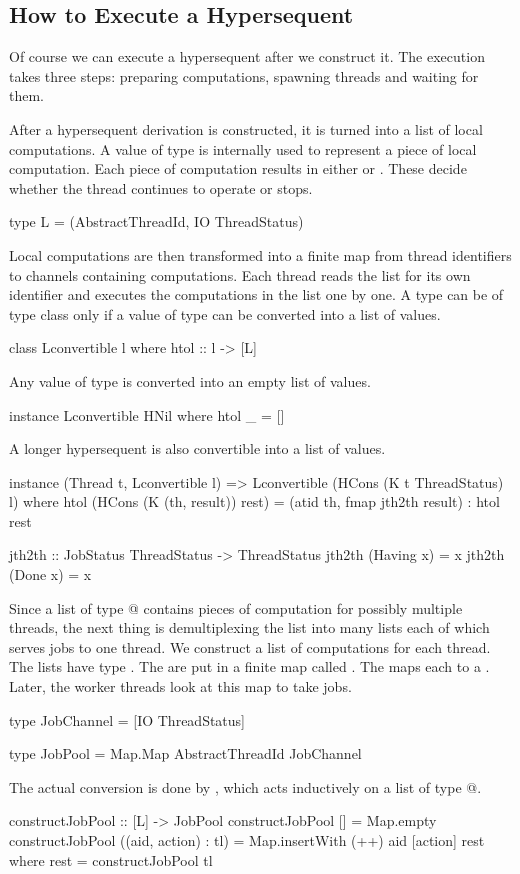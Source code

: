 \subsection{How to Execute a Hypersequent}
Of course we can execute a hypersequent after we construct it.  The
execution takes three steps: preparing computations, spawning
threads and waiting for them.

After a hypersequent derivation is constructed, it is turned into a list
of local computations.  A value of type \verb@L@ is internally used to
represent a piece of
local computation.  Each piece of computation results in either \verb@TryAnotherJob@
or \verb@Finished@.  These decide whether the thread continues to operate or stops.
\begin{code}
type L = (AbstractThreadId, IO ThreadStatus)
\end{code}

Local computations are then transformed into a finite map from thread
identifiers to channels containing computations. Each thread reads the list for
its own identifier and executes the computations in the list one by one.
A type \verb@l@ can be of type class \verb@Lconvertible@ only if
a value of type \verb@l@ can be converted into a list of \verb@L@
values.
\begin{code}
class Lconvertible l where
    htol :: l -> [L]
\end{code}
Any value of type \verb@HNil@ is converted into an empty list of
\verb@L@ values.
\begin{code}
instance Lconvertible HNil where
    htol _ = []
\end{code}
A longer hypersequent is also convertible into a list of \verb@L@ values.
\begin{code}
instance (Thread t, Lconvertible l) =>
 Lconvertible (HCons (K t ThreadStatus) l) where
    htol (HCons (K (th, result)) rest) =
      (atid th, fmap jth2th result) : htol rest

jth2th :: JobStatus ThreadStatus -> ThreadStatus
jth2th (Having x) = x
jth2th (Done x) = x
\end{code}

Since a list of type \verb@[L]@ contains pieces of computation for
possibly multiple threads, the next thing is demultiplexing the list
into many lists each of which serves jobs to one thread.
We construct a list of computations for each thread.  The lists have type
\verb@JobChannel@.  The \verb@JobChannel@s are put in a finite map called
\verb@JobPool@.  The \verb@JobPool@ maps each \verb@AbstractThreadId@ to a
\verb@JobChannel@.  Later, the worker threads look at this map to take
jobs.
\begin{code}
type JobChannel = [IO ThreadStatus]

type JobPool =
    Map.Map AbstractThreadId JobChannel
\end{code}
The actual conversion is done by \verb@constructJobPool@, which acts
inductively on a list of type \verb@[L]@.
\begin{code}
constructJobPool :: [L] -> JobPool
constructJobPool [] = Map.empty
constructJobPool ((aid, action) : tl) =
  Map.insertWith (++) aid [action] rest
     where rest = constructJobPool tl
\end{code}


